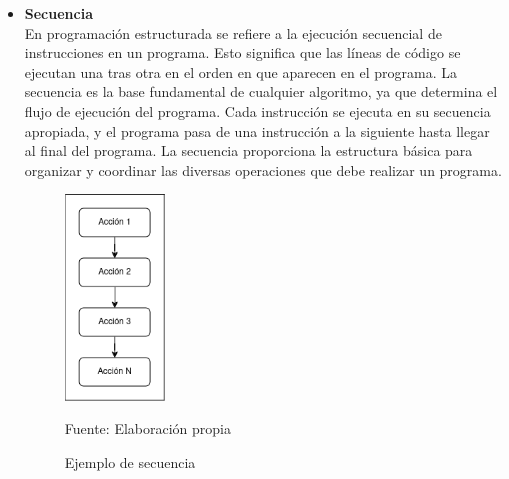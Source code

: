 \begin{itemize}
  \item \textbf{Secuencia} \\
  En programación estructurada se refiere a la ejecución secuencial de instrucciones en un programa. Esto significa que las líneas de código se ejecutan una tras otra en el orden en que aparecen en el programa. La secuencia es la base fundamental de cualquier algoritmo, ya que determina el flujo de ejecución del programa. Cada instrucción se ejecuta en su secuencia apropiada, y el programa pasa de una instrucción a la siguiente hasta llegar al final del programa. La secuencia proporciona la estructura básica para organizar y coordinar las diversas operaciones que debe realizar un programa.
  \begin{figure}[!h]
    \centering
    \includegraphics[width=0.25\textwidth]{images/secuencia.png}
    \caption{Ejemplo de secuencia}
    \centering Fuente: Elaboración propia
    \label{fig:acciones}
  \end{figure}
  \newline


\end{itemize}
